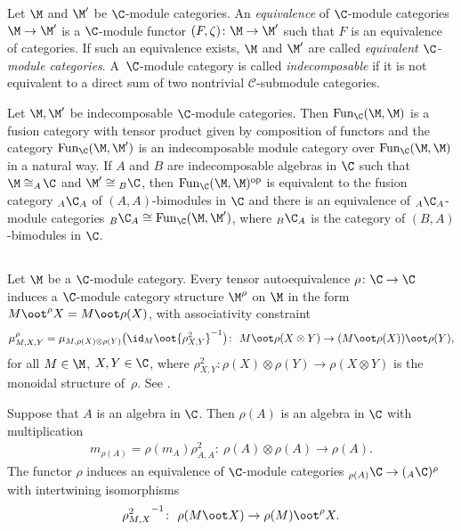 Let $\M$ and $\M'$ be $\C$-module categories. An \emph{equivalence} of $\C$-module categories $\M \to \M'$ is a $\C$-module functor $(F, \zeta)\colon \M\to \M'$ such that $F$ is an equivalence of categories. If such an equivalence exists, $\M$ and $\M'$ are called \emph{equivalent $\C$-module categories}. A~$\C$-module category is called \emph{indecomposable} if it is not equivalent to a direct sum of two nontrivial $\mathcal{C}$-submodule categories.

Let $\M, \M'$ be indecomposable $\C$-module categories. Then $\operatorname{Fun}_\C(\M, \M)$ is a fusion category with tensor product given by composition of functors and the category $\operatorname{Fun}_\C(\M, \M')$ is an indecomposable module category over $\operatorname{Fun}_\C(\M, \M)$ in a natural way. If $A$ and $B$ are indecomposable algebras in $\C$ such that $\M \cong _A\!\C$ and $\M' \cong {}_B\C$, then $\operatorname{Fun}_\C(\M, \M)^{\rm op}$ is equivalent to the fusion category $_A\C_A$ of $(A, A)$-bimodules in $\C$ and there is an equivalence of $_A\C_A$-module categories $_B\C_A \cong \operatorname{Fun}_\C(\M, \M')$, where $_B\C_A$ is the category of $(B, A)$-bimodules in $\C$.

\subsection{}\label{action-mc} Let $\M$ be a $\C$-module category. Every tensor autoequivalence $\rho\colon \C \to \C$ induces a $\C$-module category structure $\M^\rho$ on $\M$ in the form $M \oot^\rho X = M\oot \rho(X)$, with associativity constraint
\begin{gather*}\mu^\rho_{M, X, Y} = \mu_{M, \rho(X) \otimes \rho(Y)} \big(\id_M \oot {\rho^2_{X, Y}}^{-1}\big)\colon \ M \oot \rho(X\otimes Y) \to (M\oot \rho(X)) \oot \rho(Y),\end{gather*} for all $M \in \M$, $X, Y \in \C$, where $\rho^2_{X, Y}\colon \rho(X) \otimes \rho(Y) \to \rho(X \otimes Y)$ is the monoidal structure of~$\rho$. See \cite[Section~3.2]{nikshych}.

Suppose that $A$ is an algebra in $\C$. Then $\rho(A)$ is an algebra in $\C$ with multiplication
\begin{gather*}m_{\rho(A)} = \rho(m_A) \rho^2_{A, A}\colon \ \rho(A) \otimes \rho(A) \to \rho(A).\end{gather*}
The functor $\rho$ induces an equivalence of $\C$-module categories $_{\rho(A)}\C \to (_A\C)^\rho$ with intertwining isomorphisms
\begin{gather*} {\rho^2_{M, X}}^{-1}\colon \ \rho(M \oot X) \to \rho(M) \oot^\rho X.\end{gather*}

